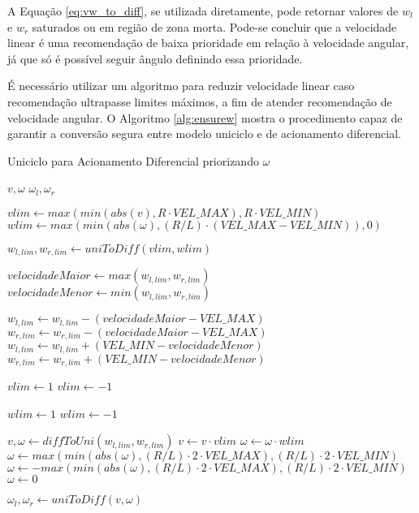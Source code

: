 	A Equação \ref{eq:vw_to_diff}, se utilizada diretamente, pode retornar valores de 
	$w_l$ e $w_r$ saturados ou em região de zona morta. Pode-se concluir que a velocidade linear 
	é uma recomendação de baixa prioridade em relação à velocidade angular, já que só é possível 
	seguir ângulo definindo essa prioridade.
	
	É necessário utilizar um algoritmo para reduzir velocidade linear caso recomendação ultrapasse 
	limites máximos, a fim de atender recomendação de velocidade angular. O Algoritmo 
	\ref{alg:ensurew} mostra o procedimento capaz de garantir a conversão segura entre modelo
	uniciclo e de acionamento diferencial. 
		
	\begin{algorithm}
	\caption{Uniciclo para Acionamento Diferencial priorizando $\omega$}
	\label{alg:ensurew}%
	\begin{algorithmic}[1]
	
	\REQUIRE $v, \omega$
	\ENSURE $\omega_l, \omega_r$
	
		\STATE $vlim \leftarrow max(min(abs(v), R \cdot VEL\_MAX), R \cdot VEL\_MIN)$
		\STATE $wlim \leftarrow max(min(abs(\omega), (R/L) \cdot (VEL\_MAX - VEL\_MIN)), 0)$
		
		\STATE $w_{l,lim}, w_{r,lim} \leftarrow uniToDiff(vlim, wlim)$
		
		\STATE $ velocidadeMaior \leftarrow max(w_{l,lim}, w_{r,lim})$
		\STATE $ velocidadeMenor \leftarrow min(w_{l,lim}, w_{r,lim})$
	
			\STATE $w_{l,lim} \leftarrow w_{l,lim} - (velocidadeMaior - VEL\_MAX)$
			\STATE $w_{r,lim} \leftarrow w_{r,lim} - (velocidadeMaior - VEL\_MAX)$
			\STATE $w_{l,lim} \leftarrow w_{l,lim} + (VEL\_MIN - velocidadeMenor)$
			\STATE $w_{r,lim} \leftarrow w_{r,lim} + (VEL\_MIN - velocidadeMenor)$
		\ENDIF
		
			\STATE $vlim \leftarrow 1$
		\ELSE
			\STATE $vlim \leftarrow -1$
		\ENDIF
			
			\STATE $wlim \leftarrow 1$
		\ELSE
			\STATE $wlim \leftarrow -1$
		\ENDIF
			
		\STATE $v,\omega \leftarrow diffToUni(w_{l,lim},w_{r,lim})$
		\STATE $v \leftarrow v \cdot vlim$
		\STATE $\omega \leftarrow \omega \cdot wlim$
	\ELSE
				\STATE $\omega \leftarrow max(min(abs(\omega),(R/L) \cdot 2 \cdot VEL\_MAX),(R/L) \cdot 2 \cdot VEL\_MIN)$ 
			\ELSE
				\STATE $\omega \leftarrow -max(min(abs(\omega),(R/L) \cdot 2 \cdot VEL\_MAX),(R/L) \cdot 2 \cdot VEL\_MIN)$
			\ENDIF
		\ELSE
			\STATE $\omega \leftarrow 0$
		\ENDIF
	\ENDIF
		
	\STATE $\omega_l, \omega_r \leftarrow uniToDiff(v,\omega)$
	
	\end{algorithmic}
	\end{algorithm}

